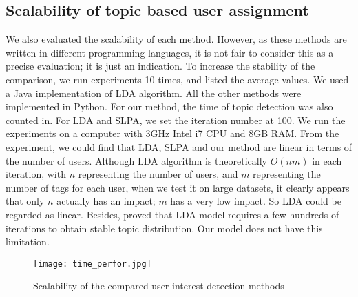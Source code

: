 \subsection{Scalability of topic based user assignment}
We also evaluated the scalability of each method. However, as these methods are written in different programming languages, it is not fair to consider this as a precise evaluation; it is just an indication. To increase the stability of the comparison, we run experiments 10 times, and listed the average values. We used a Java implementation of LDA algorithm. All the other methods were implemented in Python. For our method, the time of topic detection was also counted in. For LDA and SLPA, we set the iteration number at 100. We run the experiments on a computer with 3GHz Intel i7 CPU and 8GB RAM. From the experiment, we could find that LDA, SLPA and our method are linear in terms of the number of users. Although LDA algorithm is theoretically $O(nm)$ in each iteration, with $n$ representing the number of users, and $m$ representing the number of tags for each user, when we test it on large datasets, it clearly appears that only $n$ actually has an impact; $m$ has a very low impact. So LDA could be regarded as linear. Besides, \cite{griffiths2004finding} proved that LDA model requires a few hundreds of iterations to obtain stable topic distribution. Our model does not have this limitation.
\begin{figure}[htp]\centering
\texttt{[image: time\_perfor.jpg]} 
\caption{Scalability of the compared user interest detection methods}
\label{fig:scalability} %
\end{figure}



